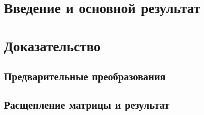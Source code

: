 \section{Введение и основной результат}

\section{Доказательство}
\subsection*{Предварительные преобразования}

\subsection*{Расщепление матрицы и результат}


